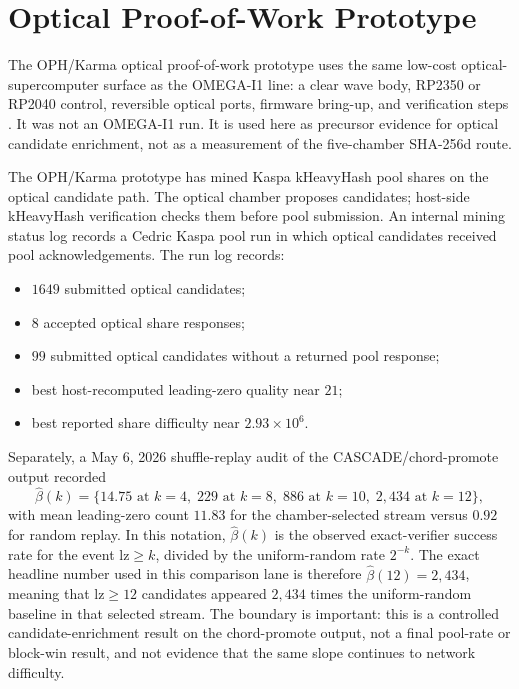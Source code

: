 \documentclass[11pt]{article}
\theoremstyle{definition}
\theoremstyle{remark}
\begin{document}
\section{Optical Proof-of-Work Prototype}

The OPH/Karma optical proof-of-work prototype uses the same low-cost
optical-supercomputer surface as the OMEGA-I1 line: a clear wave body, RP2350 or
RP2040 control, reversible optical ports, firmware bring-up, and verification
steps \cite{OmegaOpticalSupercomputer2026}. It was not an OMEGA-I1 run. It is
used here as precursor evidence for optical candidate enrichment, not as a
measurement of the five-chamber SHA-256d route.

The OPH/Karma prototype has mined Kaspa kHeavyHash pool shares on the optical
candidate path. The optical chamber proposes candidates; host-side kHeavyHash
verification checks them before pool submission. An internal mining status log
records a Cedric Kaspa pool run in which optical candidates received pool
acknowledgements. The run log records:

\begin{itemize}
\item \(1649\) submitted optical candidates;
\item \(8\) accepted optical share responses;
\item \(99\) submitted optical candidates without a returned pool response;
\item best host-recomputed leading-zero quality near \(21\);
\item best reported share difficulty near \(2.93\times 10^6\).
\end{itemize}

Separately, a May 6, 2026 shuffle-replay audit of the CASCADE/chord-promote
output recorded
\[
\widehat\beta(k)=
\{14.75\text{ at }k=4,\;229\text{ at }k=8,\;886\text{ at }k=10,\;
2{,}434\text{ at }k=12\},
\]
with mean leading-zero count \(11.83\) for the chamber-selected stream versus
\(0.92\) for random replay. In this notation, \(\widehat\beta(k)\) is the
observed exact-verifier success rate for the event \(\mathrm{lz}\ge k\), divided
by the uniform-random rate \(2^{-k}\). The exact headline number used in this
comparison lane is therefore \(\widehat\beta(12)=2{,}434\), meaning that
\(\mathrm{lz}\ge12\) candidates appeared \(2{,}434\) times the uniform-random
baseline in that selected stream. The boundary is important:
this is a controlled candidate-enrichment result on the chord-promote output,
not a final pool-rate or block-win result, and not evidence that the same slope
continues to network difficulty.
\end{document}
